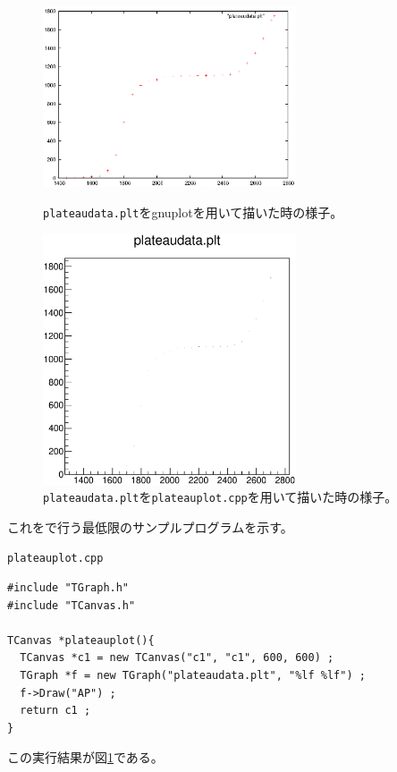 \documentclass{jarticle}
\begin{document}
 \begin{figure}[htbp]
  \begin{minipage}{0.47\hsize}
   \begin{center}
    \includegraphics[width = 75mm]{./picture/plateaugnuplot.eps}
   \end{center}
   \caption{\texttt{plateaudata.plt}をgnuplotを用いて描いた時の様子。}
   \label{Fig:plateaugnuplot}
  \end{minipage}
  \begin{minipage}{0.53\hsize}
   \begin{center}
    \includegraphics[width = 75mm]{./picture/plateaucanvas1.eps}
   \end{center}
   \caption{\texttt{plateaudata.plt}を\texttt{plateauplot.cpp}を用いて描いた時の様子。}
   \label{Fig:plateaucanvas1}
  \end{minipage}
 \end{figure}
 
 これを\ROOT で行う最低限のサンプルプログラムを示す。
  \begin{itembox}{\texttt{plateauplot.cpp}}
\begin{verbatim}
#include "TGraph.h"
#include "TCanvas.h"

TCanvas *plateauplot(){
  TCanvas *c1 = new TCanvas("c1", "c1", 600, 600) ;
  TGraph *f = new TGraph("plateaudata.plt", "%lf %lf") ;
  f->Draw("AP") ;
  return c1 ;
}
\end{verbatim}
  \end{itembox}
  この実行結果が図\ref{Fig:plateaucanvas1}である。
  
\end{document}
